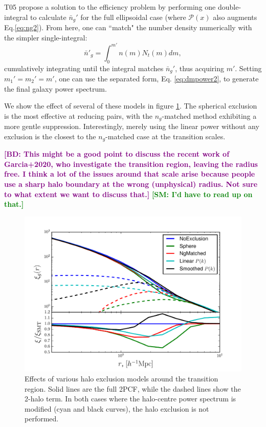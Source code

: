 \documentclass[5p]{elsarticle}
\newcommand{\bd}[1]{\textcolor{purple}{\textbf{[BD: #1]}}}
\newcommand{\sgm}[1]{\textcolor{green}{\textbf{[SM: #1]}}}
\begin{document}
T05 propose a solution to the efficiency problem by performing one double-integral to calculate $\bar{n}_g'$ for the full ellipsoidal case (where $\mathcal{P}(x)$ also augments Eq.\ref{eq:ng2}). From here, one can ``match" the number density numerically with the simpler single-integral:
\begin{equation}
\label{eq:theory:ng_dash}
 \bar{n}'_g = \int_0^{m'} n(m)N_t(m)dm,
\end{equation}
cumulatively integrating until the integral matches $\bar{n}_g'$, thus acquiring $m'$. 
Setting $m_1' = m_2' = m'$, one can use the separated form,  Eq. \ref{eq:dmpower2}, to generate the final galaxy power spectrum.

We show the effect of several of these models in figure \ref{fig:halo_exclusion}. The spherical exclusion is the most effective at reducing pairs, with the $n_g$-matched method exhibiting a more gentle suppression. Interestingly, merely using the linear power without any exclusion is the closest to the $n_g$-matched case at the transition scales. 

\bd{This might be a good point to discuss the recent work of Garcia+2020, who investigate the transition region, leaving the radius free. I think a lot of the issues around that scale arise because people use a sharp halo boundary at the wrong (unphysical) radius. Not sure to what extent we want to discuss that.}
\sgm{I'd have to read up on that.}

\begin{figure}
  \centering
  \includegraphics[width=\linewidth]{figures/corr_exclusion.pdf}
  \caption[Effect of halo exclusion, including several models]{Effects of various halo exclusion models around the transition region. Solid lines are the full 2PCF, while the dashed lines show the 2-halo term. In both cases where the halo-centre power spectrum is modified (cyan and black curves), the halo exclusion is not performed. }
  \label{fig:halo_exclusion}
\end{figure}
\end{document}
